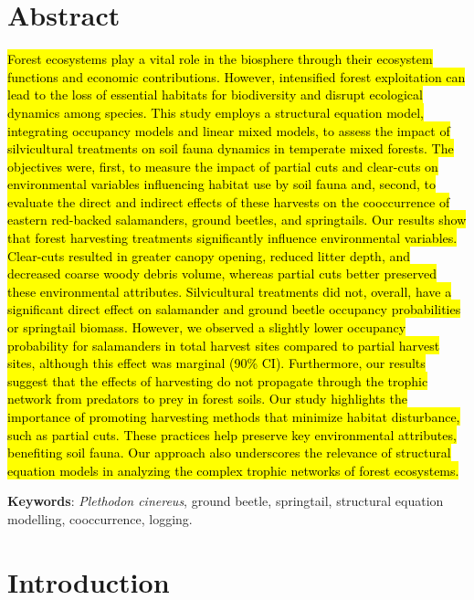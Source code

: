 \clearpage

\section*{Abstract}
\label{sec:abstract1}

\hl{Forest ecosystems play a vital role in the biosphere through their ecosystem functions and economic contributions. 
However, intensified forest exploitation can lead to the loss of essential habitats for biodiversity and disrupt ecological dynamics among species. 
This study employs a structural equation model, integrating occupancy models and linear mixed models, to assess the impact of silvicultural treatments on soil fauna dynamics in temperate mixed forests. 
The objectives were, first, to measure the impact of partial cuts and clear-cuts on environmental variables influencing habitat use by soil fauna and, second, to evaluate the direct and indirect effects of these harvests on the cooccurrence of eastern red-backed salamanders, ground beetles, and springtails. 
Our results show that forest harvesting treatments significantly influence environmental variables. 
Clear-cuts resulted in greater canopy opening, reduced litter depth, and decreased coarse woody debris volume, whereas partial cuts better preserved these environmental attributes. 
Silvicultural treatments did not, overall, have a significant direct effect on salamander and ground beetle occupancy probabilities or springtail biomass. 
However, we observed a slightly lower occupancy probability for salamanders in total harvest sites compared to partial harvest sites, although this effect was marginal (90\% CI). 
Furthermore, our results suggest that the effects of harvesting do not propagate through the trophic network from predators to prey in forest soils. 
Our study highlights the importance of promoting harvesting methods that minimize habitat disturbance, such as partial cuts. 
These practices help preserve key environmental attributes, benefiting soil fauna. 
Our approach also underscores the relevance of structural equation models in analyzing the complex trophic networks of forest ecosystems.}

\textbf{Keywords}: \textit{Plethodon cinereus}, ground beetle, springtail, structural equation modelling, cooccurrence, logging.


\cleardoublepage

\section*{Introduction}
\label{sec:intro1}

